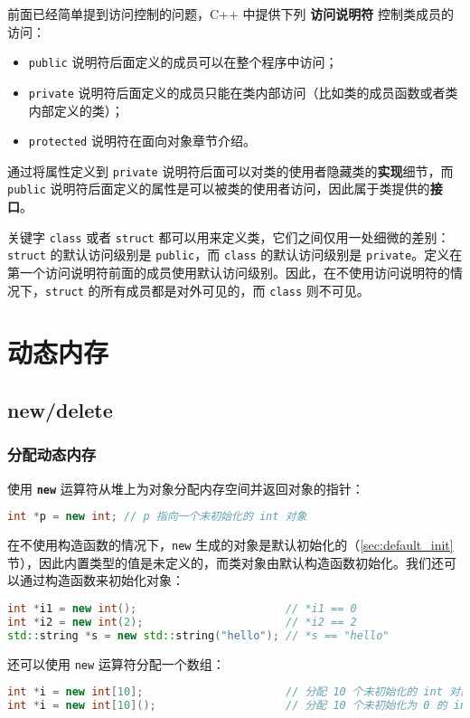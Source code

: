 \documentclass[hyperref,UTF8]{article}
\begin{document}
前面已经简单提到访问控制的问题，C++ 中提供下列 \textbf{访问说明符} 控制类成员的访问：

\begin{itemize}
  \item \texttt{public} 说明符后面定义的成员可以在整个程序中访问；
  \item \texttt{private} 说明符后面定义的成员只能在类内部访问（比如类的成员函数或者类内部定义的类）；
  \item \texttt{protected} 说明符在面向对象章节介绍。
\end{itemize}

通过将属性定义到 \texttt{private} 说明符后面可以对类的使用者隐藏类的\textbf{实现}细节，而 \texttt{public} 说明符后面定义的属性是可以被类的使用者访问，因此属于类提供的\textbf{接口}。

关键字 \texttt{class} 或者 \texttt{struct} 都可以用来定义类，它们之间仅用一处细微的差别：\texttt{struct} 的默认访问级别是 \texttt{public}，而 \texttt{class} 的默认访问级别是 \texttt{private}。定义在第一个访问说明符前面的成员使用默认访问级别。因此，在不使用访问说明符的情况下，\texttt{struct} 的所有成员都是对外可见的，而 \texttt{class} 则不可见。



\section{动态内存}

\subsection{new/delete}

\subsubsection{分配动态内存}

使用 \textbf{\texttt{new}} 运算符从堆上为对象分配内存空间并返回对象的指针：
\begin{lstlisting}[language=c++,numbers=none]
int *p = new int; // p 指向一个未初始化的 int 对象
\end{lstlisting}
在不使用构造函数的情况下，\texttt{new} 生成的对象是默认初始化的（\ref{sec:default_init} 节），因此内置类型的值是未定义的，而类对象由默认构造函数初始化。我们还可以通过构造函数来初始化对象：
\begin{lstlisting}[language=c++]
int *i1 = new int();                       // *i1 == 0
int *i2 = new int(2);                      // *i2 == 2
std::string *s = new std::string("hello"); // *s == "hello"
\end{lstlisting}
还可以使用 \texttt{new} 运算符分配一个数组：
\begin{lstlisting}[language=c++]
int *i = new int[10];                      // 分配 10 个未初始化的 int 对象
int *i = new int[10]();                    // 分配 10 个未初始化为 0 的 int 对象
\end{lstlisting}
\end{document}
